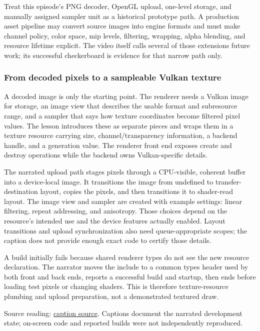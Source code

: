 Treat this episode's PNG decoder, OpenGL upload, one-level storage, and manually assigned sampler unit as a historical prototype path. A production asset pipeline may convert source images into engine formats and must make channel policy, color space, mip levels, filtering, wrapping, alpha blending, and resource lifetime explicit. The video itself calls several of those extensions future work; its successful checkerboard is evidence for that narrow path only.

\subsubsection{From decoded pixels to a sampleable Vulkan texture}\label{06-engine-ii-ch027-from-decoded-pixels-to-a-sampleable-vulkan-texture}

A decoded image is only the starting point. The renderer needs a Vulkan image for storage, an image view that describes the usable format and subresource range, and a sampler that says how texture coordinates become filtered pixel values. The lesson introduces these as separate pieces and wraps them in a texture resource carrying size, channel/transparency information, a backend handle, and a generation value. The renderer front end exposes create and destroy operations while the backend owns Vulkan-specific details.

The narrated upload path stages pixels through a CPU-visible, coherent buffer into a device-local image. It transitions the image from undefined to transfer-destination layout, copies the pixels, and then transitions it to shader-read layout. The image view and sampler are created with example settings: linear filtering, repeat addressing, and anisotropy. Those choices depend on the resource's intended use and the device features actually enabled. Layout transitions and upload synchronization also need queue-appropriate scopes; the caption does not provide enough exact code to certify those details.

A build initially fails because shared renderer types do not see the new resource declaration. The narrator moves the include to a common types header used by both front and back ends, reports a successful build and startup, then ends before loading test pixels or changing shaders. This is therefore texture-resource plumbing and upload preparation, not a demonstrated textured draw.

Source reading: \href{https://www.youtube.com/watch?v=u-eyZCV_MRs}{caption source}. Captions document the narrated development state; on-screen code and reported builds were not independently reproduced.

